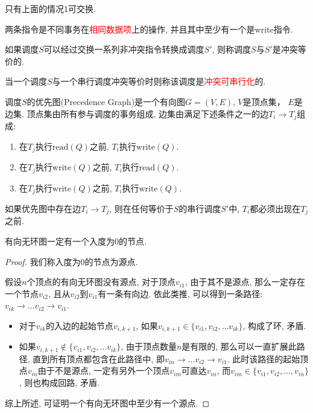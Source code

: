 只有上面的情况1可交换.

\begin{definition}[冲突指令]
  两条指令是不同事务在\textcolor{red}{相同数据项}上的操作, 并且其中至少有一个是write指令.
\end{definition}

\begin{definition}[冲突等价]
  如果调度$S$可以经过交换一系列非冲突指令转换成调度$S'$, 则称调度$S$与$S'$是冲突等价的.
\end{definition}

\begin{definition}[冲突可串行化]
  当一个调度$S$与一个串行调度冲突等价时则称该调度是\textcolor{red}{冲突可串行化}的.
\end{definition}

\begin{definition}[优先图]
  调度$S$的优先图(Precedence Graph)是一个有向图$G=(V,E)$, $V$是顶点集，
  $E$是边集. 顶点集由所有参与调度的事务组成, 边集由满足下述条件之一的边$T_i\to T_j$组成:
  \begin{enumerate}
      \item 在$T_j$执行$\text{read}(Q)$之前, $T_i$执行$\text{write}(Q)$.
      \item 在$T_j$执行$\text{write}(Q)$之前, $T_i$执行$\text{read}(Q)$.
      \item 在$T_j$执行$\text{write}(Q)$之前, $T_i$执行$\text{write}(Q)$.
  \end{enumerate}
\end{definition}

\begin{theorem}
  如果优先图中存在边$T_i\to T_j$, 则在任何等价于$S$的串行调度$S'$中, $T_i$都必须出现在$T_j$之前.
\end{theorem}

\begin{lemma}\label{lemma:DAG}
  有向无环图一定有一个入度为0的节点.
\end{lemma}
\begin{proof}
  我们称入度为0的节点为源点.

  假设$n$个顶点的有向无环图没有源点, 对于顶点$v_{i1}$, 
  由于其不是源点, 那么一定存在一个节点$v_{i2}$, 
  且从$v_{i2}$到$v_{i1}$有一条有向边.
  依此类推, 可以得到一条路径: $v_{ik}\to \dots v_{i2}\to v_{i1}$.
  \begin{itemize}
    \item 对于$v_{ik}$的入边的起始节点$v_{i,k+1}$, 如果$v_{i,k+1}\in\{v_{i1}, v_{i2},\dots v_{ik}\}$, 构成了环, 矛盾.
    \item 如果$v_{i,k+1}\not\in\{v_{i1}, v_{i2},\dots v_{ik}\}$, 由于顶点数量$n$是有限的, 那么可以一直扩展此路径, 直到所有顶点都包含在此路径中, 即$v_{in}\to \dots v_{i2}\to v_{i1}$.
    此时该路径的起始顶点$v_{in}$由于不是源点, 一定有另外一个顶点$v_{im}$可直达$v_{in}$,
    而$v_{im}\in\{v_{i1},v_{i2},\dots,v_{in}\}$, 则也构成回路, 矛盾.
  \end{itemize}
  综上所述, 可证明一个有向无环图中至少有一个源点.
\end{proof}

